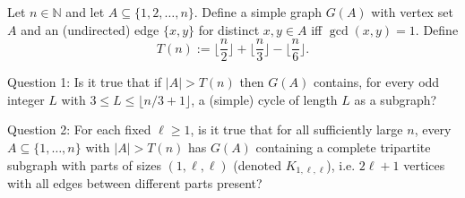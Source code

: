 Let $n\in\mathbb N$ and let $A\subseteq\{1,2,\dots,n\}$. Define a simple graph $G(A)$ with vertex set $A$ and an (undirected) edge $\{x,y\}$ for distinct $x,y\in A$ iff $\gcd(x,y)=1$.
Define
\[T(n):=\Big\lfloor\frac n2\Big\rfloor+\Big\lfloor\frac n3\Big\rfloor-\Big\lfloor\frac n6\Big\rfloor.
\]

Question 1: Is it true that if $|A|>T(n)$ then $G(A)$ contains, for every odd integer $L$ with $3\le L\le \lfloor n/3+1\rfloor$, a (simple) cycle of length $L$ as a subgraph?

Question 2: For each fixed $\ell\ge 1$, is it true that for all sufficiently large $n$, every $A\subseteq\{1,\dots,n\}$ with $|A|>T(n)$ has $G(A)$ containing a complete tripartite subgraph with parts of sizes $(1,\ell,\ell)$ (denoted $K_{1,\ell,\ell}$), i.e. $2\ell+1$ vertices with all edges between different parts present?
